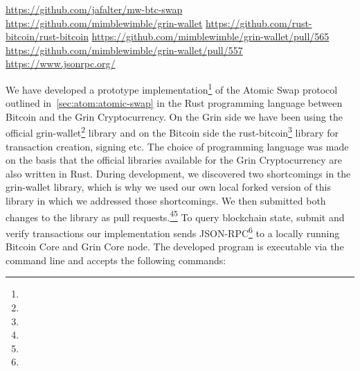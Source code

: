 \urldef\urlgithub\url{https://github.com/jafalter/mw-btc-swap}
\urldef\urlgrinwallet\url{https://github.com/mimblewimble/grin-wallet}
\urldef\urlrustbitcoin\url{https://github.com/rust-bitcoin/rust-bitcoin}
\urldef\urlprone\url{https://github.com/mimblewimble/grin-wallet/pull/565}
\urldef\urlprtwo\url{https://github.com/mimblewimble/grin-wallet/pull/557}
\urldef\urljsonrpc\url{https://www.jsonrpc.org/}

We have developed a prototype implementation\footnote{\urlgithub} of the Atomic Swap protocol outlined in~\cref{sec:atom:atomic-swap} in the Rust programming language between Bitcoin and the Grin Cryptocurrency.
On the Grin side we have been using the official grin-wallet\footnote{\urlgrinwallet} library and on the Bitcoin side the rust-bitcoin\footnote{\urlrustbitcoin} library for transaction creation, signing etc.
The choice of programming language was made on the basis that the official libraries available for the Grin Cryptocurrency are also written in Rust.
During development, we discovered two shortcomings in the grin-wallet library, which is why we used our own local forked version of this library in which we addressed those shortcomings.
We then submitted both changes to the library as pull requests.\footnote{\urlprone}\footnote{\urlprtwo}
To query blockchain state, submit and verify transactions our implementation sends JSON-RPC\footnote{\urljsonrpc} to a locally running Bitcoin Core and Grin Core node.
The developed program is executable via the command line and accepts the following commands:
